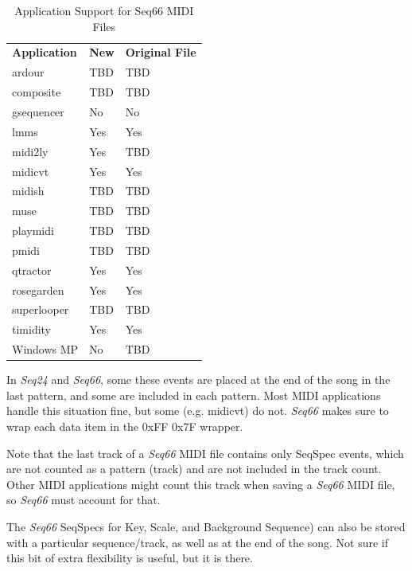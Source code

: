    \begin{table}
      \centering
      \caption{Application Support for Seq66 MIDI Files}
      \label{table:midi_file_support_table}
      \begin{tabular}{l l l}
         \textbf{Application}  &
            \textbf{New} & 
            \textbf{Original File} \\
         ardour       & TBD       & TBD \\
         composite    & TBD       & TBD \\
         gsequencer   & No        & No  \\
         lmms         & Yes       & Yes \\
         midi2ly      & Yes       & TBD \\
         midicvt      & Yes       & Yes \\
         midish       & TBD       & TBD \\
         muse         & TBD       & TBD \\
         playmidi     & TBD       & TBD \\
         pmidi        & TBD       & TBD \\
         qtractor     & Yes       & Yes \\
         rosegarden   & Yes       & Yes \\
         superlooper  & TBD       & TBD \\
         timidity     & Yes       & Yes \\
         Windows MP   & No        & TBD \\
      \end{tabular}
   \end{table}

   In \textsl{Seq24} and \textsl{Seq66},
   some these events are placed at the end of the song in the last pattern,
   and some are included in each pattern.
   Most MIDI applications handle this situation
   fine, but some (e.g. midicvt) do not.  \textsl{Seq66} makes
   sure to wrap each data item in the 0xFF 0x7F wrapper.

   Note that the last track of a \textsl{Seq66} MIDI file contains
   only SeqSpec events, which are not counted as a pattern (track) and
   are not included in the track count.
   Other MIDI applications might count this track when saving a
   \textsl{Seq66} MIDI file, so \textsl{Seq66} must account for that.

   The \textsl{Seq66} SeqSpecs for Key, Scale, and Background Sequence)
   can also be stored with a particular sequence/track,
   as well as at the end of the song.
   Not sure if this bit of extra
   flexibility is useful, but it is there.

